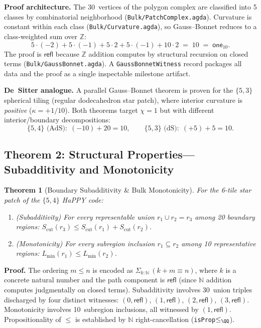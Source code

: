 \documentclass[11pt, a4paper]{article}
\theoremstyle{plain}
\newtheorem{theorem}{Theorem}[section]
\theoremstyle{definition}
\newcommand{\refl}{\mathsf{refl}}
\newcommand{\NN}{\mathbb{N}}
\newcommand{\ZZ}{\mathbb{Z}}
\newcommand{\Scut}{S_{\mathrm{cut}}}
\newcommand{\Lmin}{L_{\mathrm{min}}}
\begin{document}
\noindent
\textbf{Proof architecture.}
The 30~vertices of the polygon complex are classified into 5
classes by combinatorial neighborhood (\texttt{Bulk/PatchComplex.agda}).
Curvature is constant within each class
(\texttt{Bulk/Curvature.agda}), so Gauss--Bonnet reduces to a
class-weighted sum over $\ZZ$:
\[
  5 \cdot (-2) + 5 \cdot (-1) + 5 \cdot 2 + 5 \cdot (-1) + 10 \cdot 2
  \;=\; 10 \;=\; \mathsf{one}_{10}.
\]
The proof is $\refl$ because $\ZZ$ addition computes by structural
recursion on closed terms (\texttt{Bulk/GaussBonnet.agda}).  A
\texttt{GaussBonnetWitness} record packages all data and the
proof as a single inspectable milestone artifact.

\medskip\noindent
\textbf{De~Sitter analogue.}
A parallel Gauss--Bonnet theorem is proven for the $\{5,3\}$
spherical tiling (regular dodecahedron star patch), where interior
curvature is \emph{positive} ($\kappa = +1/10$).  Both theorems
target $\chi = 1$ but with different interior/boundary
decompositions:
\[
  \{5,4\}\text{ (AdS)}: \; (-10) + 20 = 10,
  \qquad
  \{5,3\}\text{ (dS)}: \; (+5) + 5 = 10.
\]

\subsection{Theorem 2: Structural Properties---Subadditivity and Monotonicity}
\label{sec:thm2}

\begin{theorem}[Boundary Subadditivity \& Bulk Monotonicity]
For the 6-tile star patch of the $\{5,4\}$ HaPPY code:
\begin{enumerate}[nosep,label=(\alph*)]
  \item \textup{(Subadditivity)} For every representable union
    $r_1 \cup r_2 = r_3$ among 20 boundary regions:
    $\Scut(r_3) \leq \Scut(r_1) + \Scut(r_2)$.
  \item \textup{(Monotonicity)} For every subregion inclusion
    $r_1 \subseteq r_2$ among 10 representative regions:
    $\Lmin(r_1) \leq \Lmin(r_2)$.
\end{enumerate}
\end{theorem}

\noindent
\textbf{Proof.}
The ordering $m \leq n$ is encoded as
$\Sigma_{k:\NN}\,(k + m \equiv n)$, where $k$ is a concrete
natural number and the path component is $\refl$ (since $\NN$
addition computes judgmentally on closed terms).  Subadditivity
involves 30~union triples discharged by four distinct witnesses:
$(0,\refl)$, $(1,\refl)$, $(2,\refl)$, $(3,\refl)$.
Monotonicity involves 10~subregion inclusions, all witnessed by
$(1,\refl)$.  Propositionality of $\leq$ is established by
$\NN$ right-cancellation (\texttt{isProp$\leq_\QQ$}).
\end{document}
